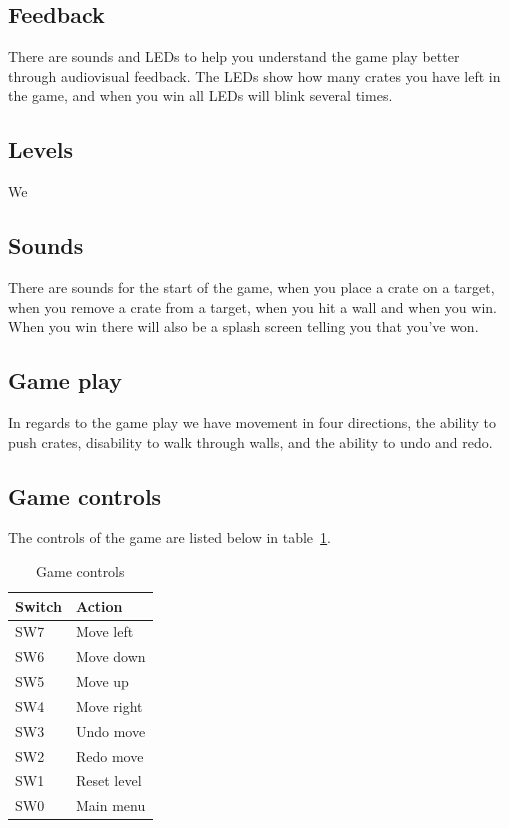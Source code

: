\documentclass[a4paper,11pt]{article}
\begin{document}
\subsection{Feedback}There are sounds and LEDs to help you understand the game play better through audiovisual feedback. The LEDs show how many crates you have left in the game, and when you win all LEDs will blink several times.

\subsection{Levels}
We 

\subsection{Sounds}There are sounds for the start of the game, when you place a crate on a target, when you remove a crate from a target, when you hit a wall and when you win. When you win there will also be a splash screen telling you that you've won. 

\subsection{Game play}
In regards to the game play we have movement in four directions, the ability to push crates, disability to walk through walls, and the ability to undo and redo. 

\subsection{Game controls}
The controls of the game are listed below in table~\ref{tab:gamecontrols}. 
\begin{table}[H]
\centering
\begin{tabular}{|l|l|}
\hline \textbf{Switch} & \textbf{Action} \\ 
\hline SW7 & Move left \\ 
\hline SW6 & Move down \\ 
\hline SW5 & Move up \\ 
\hline SW4 & Move right \\ 
\hline SW3 & Undo move \\ 
\hline SW2 & Redo move \\ 
\hline SW1 & Reset level \\ 
\hline SW0 & Main menu \\
\hline 
\end{tabular}
\caption{Game controls} 
\label{tab:gamecontrols}
\end{table}
\end{document}
